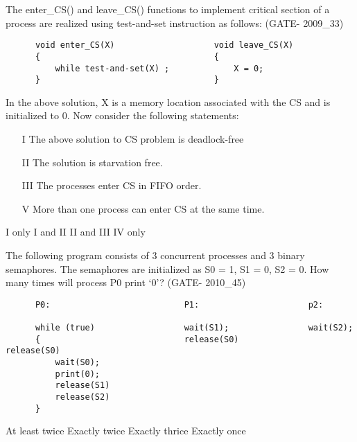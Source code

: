 \begin{questyle}

  \question  The enter\_CS() and leave\_CS() functions to implement critical section of a process are realized
              using test-and-set instruction as follows: (GATE- 2009\_33)

  \begin{lstlisting}
      void enter_CS(X)                    void leave_CS(X)
      {                                   {
          while test-and-set(X) ;             X = 0;
      }                                   }
  \end{lstlisting}
  In the above solution, X is a memory location associated with the CS and is initialized to 0. Now consider the following statements:
  \begin{enumerate}
      \item[I]  The above solution to CS problem is deadlock-free
      \item[II] The solution is starvation free.
      \item[III] The processes enter CS in FIFO order.
      \item[V]   More than one process can enter CS at the same time.
   \end{enumerate}

  \begin{choices}
    \correctchoice  I only
    \choice  I and II
    \choice  II and III
    \choice   IV only
  \end{choices}

  \end{questyle}




\begin{questyle}

  \question  The following program consists of 3 concurrent processes and 3 binary semaphores.
             The semaphores are initialized as S0 = 1, S1 = 0, S2 = 0.
             How many times will process P0 print ‘0’? (GATE- 2010\_45)

  \begin{lstlisting}
      P0:                           P1:                      p2:

      while (true)                  wait(S1);                wait(S2);
      {                             release(S0)              release(S0)
          wait(S0);
          print(0);
          release(S1)
          release(S2)
      }
  \end{lstlisting}
  \begin{choices}
    \correctchoice  At least twice
    \choice  Exactly twice
    \choice  Exactly thrice
    \choice  Exactly once
  \end{choices}

  \end{questyle}



